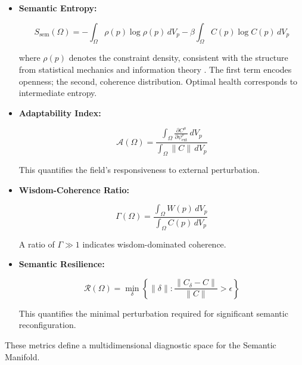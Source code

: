 \begin{itemize}

    \item \textbf{Semantic Entropy:}

    \begin{equation}
    S_{\text{sem}}(\Omega) = -\int_{\Omega} \rho(p) \log\rho(p) \, dV_p - \beta \int_{\Omega} C(p) \log C(p) \, dV_p
    \end{equation}

where $\rho(p)$ denotes the constraint density, consistent with the structure from statistical mechanics and information theory \autocite{Shannon1948, CoverThomas2006, Reif1965, PathriaBeale2011}. The first term encodes openness; the second, coherence distribution. Optimal health corresponds to intermediate entropy.

    \item \textbf{Adaptability Index:}

    \begin{equation}
    \mathcal{A}(\Omega) = \frac{\int_{\Omega} \frac{\partial C^\mu}{\partial \psi^\nu_{\text{ext}}} \, dV_p}{\int_{\Omega} \|C\| \, dV_p}
    \end{equation}

    This quantifies the field's responsiveness to external perturbation.

    \item \textbf{Wisdom-Coherence Ratio:}

    \begin{equation}
    \Gamma(\Omega) = \frac{\int_{\Omega} W(p) \, dV_p}{\int_{\Omega} C(p) \, dV_p}
    \end{equation}

    A ratio of $\Gamma \gg 1$ indicates wisdom-dominated coherence.

    \item \textbf{Semantic Resilience:}

    \begin{equation}
    \mathcal{R}(\Omega) = \min_{\delta} \left\{\|\delta\| : \frac{\|C_{\delta} - C\|}{\|C\|} > \epsilon\right\}
    \end{equation}

    This quantifies the minimal perturbation required for significant semantic reconfiguration.

\end{itemize}

These metrics define a multidimensional diagnostic space for the Semantic Manifold. 